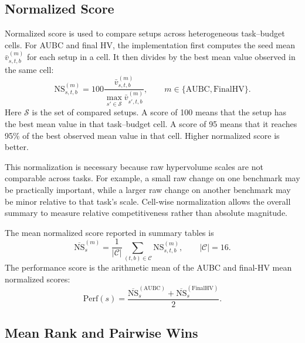 \subsection{Normalized Score}

Normalized score is used to compare setups across heterogeneous task--budget cells. For AUBC and final HV, the implementation first computes the seed mean $\bar{v}^{(m)}_{s,t,b}$ for each setup in a cell. It then divides by the best mean value observed in the same cell:
\begin{equation}
  \mathrm{NS}^{(m)}_{s,t,b}
  =
  100
  \frac{\bar{v}^{(m)}_{s,t,b}}
       {\max_{s'\in\mathcal{S}} \bar{v}^{(m)}_{s',t,b}},
  \qquad
  m\in\{\mathrm{AUBC},\mathrm{FinalHV}\}.
  \label{eq:normalized-score-chapter5}
\end{equation}
Here $\mathcal{S}$ is the set of compared setups. A score of 100 means that the setup has the best mean value in that task--budget cell. A score of 95 means that it reaches 95\% of the best observed mean value in that cell. Higher normalized score is better.

This normalization is necessary because raw hypervolume scales are not comparable across tasks. For example, a small raw change on one benchmark may be practically important, while a larger raw change on another benchmark may be minor relative to that task's scale. Cell-wise normalization allows the overall summary to measure relative competitiveness rather than absolute magnitude.

The mean normalized score reported in summary tables is
\begin{equation}
  \overline{\mathrm{NS}}^{(m)}_{s}
  =
  \frac{1}{|\mathcal{C}|}
  \sum_{(t,b)\in\mathcal{C}}
  \mathrm{NS}^{(m)}_{s,t,b},
  \qquad |\mathcal{C}|=16.
  \label{eq:mean-normalized-score-chapter5}
\end{equation}
The performance score is the arithmetic mean of the AUBC and final-HV mean normalized scores:
\begin{equation}
  \mathrm{Perf}(s)
  =
  \frac{
    \overline{\mathrm{NS}}^{(\mathrm{AUBC})}_{s}
    +
    \overline{\mathrm{NS}}^{(\mathrm{FinalHV})}_{s}
  }{2}.
  \label{eq:performance-score-chapter5}
\end{equation}

\subsection{Mean Rank and Pairwise Wins}

